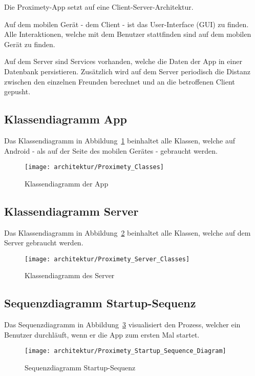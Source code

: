 Die Proximety-App setzt auf eine Client-Server-Architektur. 

Auf dem mobilen Gerät - dem Client - ist das User-Interface (GUI) zu finden. Alle Interaktionen, welche mit dem Benutzer stattfinden sind auf dem mobilen Gerät zu finden.

Auf dem Server sind Services vorhanden, welche die Daten der App in einer Datenbank persistieren. Zusätzlich wird auf dem Server periodisch die Distanz zwischen den einzelnen Freunden berechnet und an die betroffenen Client gepusht.

\subsection{Klassendiagramm App}
Das Klassendiagramm in Abbildung~\ref{fig:Proximety_Classes} beinhaltet alle Klassen, welche auf Android - als auf der Seite des mobilen Gerätes - gebraucht werden.
\FloatBarrier
\begin{figure}[H]
	\centering
		\texttt{[image: architektur/Proximety\_Classes]}
	\caption{Klassendiagramm der App}
	\label{fig:Proximety_Classes}
\end{figure}

\FloatBarrier
\subsection{Klassendiagramm Server}
Das Klassendiagramm in Abbildung~\ref{fig:Proximety_Server_Classes} beinhaltet alle Klassen, welche auf dem Server gebraucht werden.
\begin{figure}[H]
	\centering
		\texttt{[image: architektur/Proximety\_Server\_Classes]}
	\caption{Klassendiagramm des Server}
	\label{fig:Proximety_Server_Classes}
\end{figure}

\FloatBarrier
\subsection{Sequenzdiagramm Startup-Sequenz}
Das Sequenzdiagramm in Abbildung~\ref{fig:Proximety_Startup_Sequence_Diagram} visualisiert den Prozess, welcher ein Benutzer durchläuft, wenn er die App zum ersten Mal startet.
\begin{figure}[H]
	\centering
		\texttt{[image: architektur/Proximety\_Startup\_Sequence\_Diagram]}
	\caption{Sequenzdiagramm Startup-Sequenz}
	\label{fig:Proximety_Startup_Sequence_Diagram}
\end{figure}

